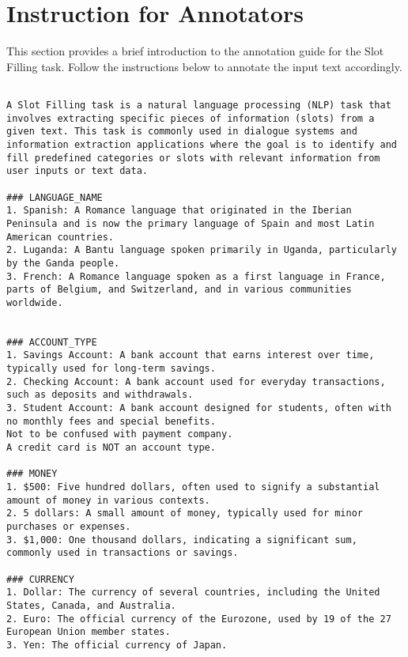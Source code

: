 


\section{Instruction for Annotators}
\label{app:annotation-instruction}

This section provides a brief introduction to the annotation guide for the Slot Filling task.
Follow the instructions below to annotate the input text accordingly.

\begin{verbatim}

A Slot Filling task is a natural language processing (NLP) task that involves extracting specific pieces of information (slots) from a given text. This task is commonly used in dialogue systems and information extraction applications where the goal is to identify and fill predefined categories or slots with relevant information from user inputs or text data.

### LANGUAGE_NAME
1. Spanish: A Romance language that originated in the Iberian Peninsula and is now the primary language of Spain and most Latin American countries.
2. Luganda: A Bantu language spoken primarily in Uganda, particularly by the Ganda people.
3. French: A Romance language spoken as a first language in France, parts of Belgium, and Switzerland, and in various communities worldwide.


### ACCOUNT_TYPE
1. Savings Account: A bank account that earns interest over time, typically used for long-term savings.
2. Checking Account: A bank account used for everyday transactions, such as deposits and withdrawals.
3. Student Account: A bank account designed for students, often with no monthly fees and special benefits.
Not to be confused with payment company. 
A credit card is NOT an account type.

### MONEY
1. $500: Five hundred dollars, often used to signify a substantial amount of money in various contexts.
2. 5 dollars: A small amount of money, typically used for minor purchases or expenses.
3. $1,000: One thousand dollars, indicating a significant sum, commonly used in transactions or savings.

### CURRENCY
1. Dollar: The currency of several countries, including the United States, Canada, and Australia.
2. Euro: The official currency of the Eurozone, used by 19 of the 27 European Union member states.
3. Yen: The official currency of Japan.


\end{verbatim}
